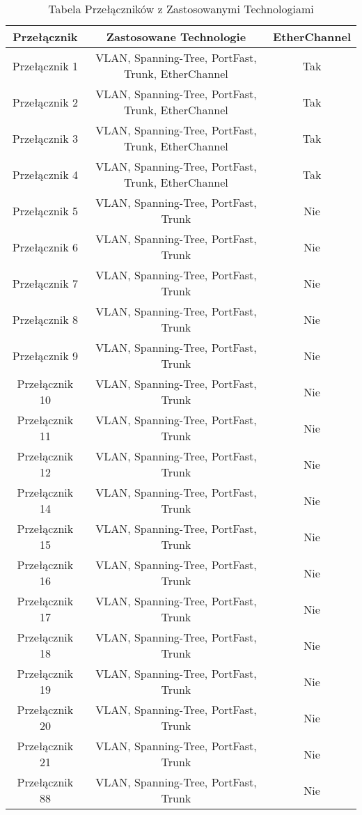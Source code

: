 \begin{table}[htbp]
\centering
\caption{Tabela Przełączników z Zastosowanymi Technologiami}
\begin{tabular}{|c|c|c|}
\hline
\textbf{Przełącznik} & \textbf{Zastosowane Technologie}       & \textbf{EtherChannel} \\ \hline
Przełącznik 1        & VLAN, Spanning-Tree, PortFast, Trunk, EtherChannel & Tak \\ \hline
Przełącznik 2        & VLAN, Spanning-Tree, PortFast, Trunk, EtherChannel & Tak \\ \hline
Przełącznik 3        & VLAN, Spanning-Tree, PortFast, Trunk, EtherChannel & Tak \\ \hline
Przełącznik 4        & VLAN, Spanning-Tree, PortFast, Trunk, EtherChannel & Tak \\ \hline
Przełącznik 5        & VLAN, Spanning-Tree, PortFast, Trunk & Nie \\ \hline
Przełącznik 6        & VLAN, Spanning-Tree, PortFast, Trunk & Nie \\ \hline
Przełącznik 7        & VLAN, Spanning-Tree, PortFast, Trunk & Nie \\ \hline
Przełącznik 8        & VLAN, Spanning-Tree, PortFast, Trunk & Nie \\ \hline
Przełącznik 9        & VLAN, Spanning-Tree, PortFast, Trunk & Nie \\ \hline
Przełącznik 10       & VLAN, Spanning-Tree, PortFast, Trunk & Nie \\ \hline
Przełącznik 11       & VLAN, Spanning-Tree, PortFast, Trunk & Nie \\ \hline
Przełącznik 12       & VLAN, Spanning-Tree, PortFast, Trunk & Nie \\ \hline
Przełącznik 14       & VLAN, Spanning-Tree, PortFast, Trunk & Nie \\ \hline
Przełącznik 15       & VLAN, Spanning-Tree, PortFast, Trunk & Nie \\ \hline
Przełącznik 16       & VLAN, Spanning-Tree, PortFast, Trunk & Nie \\ \hline
Przełącznik 17       & VLAN, Spanning-Tree, PortFast, Trunk & Nie \\ \hline
Przełącznik 18       & VLAN, Spanning-Tree, PortFast, Trunk & Nie \\ \hline
Przełącznik 19       & VLAN, Spanning-Tree, PortFast, Trunk & Nie \\ \hline
Przełącznik 20       & VLAN, Spanning-Tree, PortFast, Trunk & Nie \\ \hline
Przełącznik 21       & VLAN, Spanning-Tree, PortFast, Trunk & Nie \\ \hline
Przełącznik 88       & VLAN, Spanning-Tree, PortFast, Trunk & Nie \\ \hline
\end{tabular}
\end{table}

